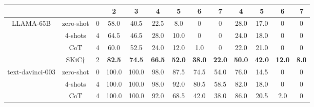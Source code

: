 \begin{table}[t]
{\begin{tabular}{c|c|c|cc|cccc||cc|cc}
 & & &\multicolumn{1}{c}{\textbf{2}} & \multicolumn{1}{c|}{\textbf{3}} & \textbf{4}   & \textbf{5}   & \textbf{6}   & \textbf{7} &\multicolumn{1}{c}{\textbf{4}} & \multicolumn{1}{c|}{\textbf{5}} & \textbf{6}   & \textbf{7} \\ \midrule \midrule
\multirow{4}{*}{LLAMA-65B} & zero-shot    &0              & 58.0                             & 40.5                             & 22.5           & 8.0            & 0            & 0            & 28.0                             & 17.0                             & 0                              & 0                              \\
                           & 4-shots  &4            & 64.5                             & 46.5                             & 28.0           & 10.0            & 0            & 0            & 24.0                             & 18.0                             & 0                              & 0                              \\
                           & CoT   &4             & 60.0                             & 52.5                             & 24.0           & 12.0           & 1.0            & 0           & 22.0                             & 21.0                             & 0                              & 0                              \\
                           & SKiC$\dag$  &2     & \textbf{82.5}                    & \textbf{74.5}                    & \textbf{66.5}  & \textbf{52.0}  & \textbf{38.0}  & \textbf{22.0}   & \textbf{50.0}                    & \textbf{42.0}                    & \textbf{12.0}                    & \textbf{8.0}                     \\   \midrule
\multirow{5}{*}{text-davinci-003}  & zero-shot  &0                & 100.0                            & 100.0                            & 98.0           & 87.5           & 74.5           & 54.0           & 76.0                             & 14.5                             & 0                              & 0                              \\
                           & 4-shots &4               & 100.0                            & 100.0                            & 98.0           & 92.0           & 80.5           & 58.5           & 82.0                             & 18.0                             & 0                              & 0                              \\
                           & CoT    &4               & 100.0                            & 100.0                            & 92.0           & 68.5           & 42.0           & 38.0            & 86.0                             & 20.5                             & 2.0                              & 0                              \\ 

\end{tabular}}
\end{table}
